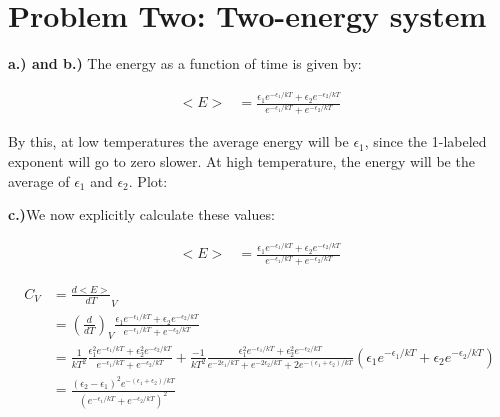 \documentclass[10pt]{article} %
\begin{document}
\section{Problem Two: Two-energy system}

\textbf{a.) and b.)} The energy as a function of time is given by:

\begin{align*}
  <E> &= \frac{\epsilon_1e^{-\epsilon_1/kT} + \epsilon_2e^{-\epsilon_2/kT}}
  {e^{-\epsilon_1/kT} + e^{-\epsilon_2/kT}}
\end{align*}

By this, at low temperatures the average energy will be $\epsilon_1$, since the
1-labeled exponent will go to zero slower. At high temperature, the energy will
be the average of $\epsilon_1$ and $\epsilon_2$. Plot:

\vspace{3cm}

\textbf{c.)}We now explicitly calculate these values:

\begin{align*}
  <E>
  &= \frac{\epsilon_1e^{-\epsilon_1/kT} + \epsilon_2e^{-\epsilon_2/kT}}
  {e^{-\epsilon_1/kT} + e^{-\epsilon_2/kT}}
\end{align*}

\begin{align*}
  C_V &= \frac{d<E>}{dT}_V\\
  &= \left(\frac{d}{dT}\right)_V
  \frac{\epsilon_1e^{-\epsilon_1/kT} + \epsilon_2e^{-\epsilon_2/kT}}
       {e^{-\epsilon_1/kT} + e^{-\epsilon_2/kT}}\\
  &= \frac{1}{kT^2}\frac{\epsilon_1^2e^{-\epsilon_1/kT} + \epsilon_2^2e^{-\epsilon_2/kT}}
  {e^{-\epsilon_1/kT} + e^{-\epsilon_2/kT}}
  + \frac{-1}{kT^2}\frac{\epsilon_1^2e^{-\epsilon_1/kT} + \epsilon_2^2e^{-\epsilon_2/kT}}
  {e^{-2\epsilon_1/kT} + e^{-2\epsilon_2/kT} + 2e^{-(\epsilon_1+\epsilon_2)/kT}}
  \left(\epsilon_1e^{-\epsilon_1/kT} + \epsilon_2e^{-\epsilon_2/kT}\right)\\
  &= \frac{(\epsilon_2-\epsilon_1)^2e^{-(\epsilon_1+\epsilon_2)/kT}}
       {\left(e^{-\epsilon_1/kT} + e^{-\epsilon_2/kT}\right)^2}\\
\end{align*}
\end{document}
